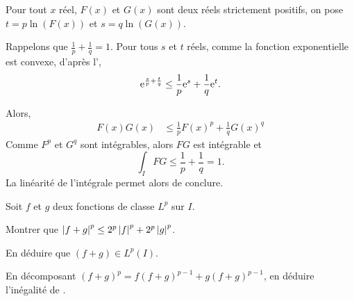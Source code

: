\begin{solution}
\begin{reponses}
\item Pour tout $x$ réel, $F(x)$ et $G(x)$ sont deux réels strictement positifs, on pose $t = p \ln(F(x))$ et $s = q \ln(G(x))$.

\item Rappelons que $\frac{1}{p} + \frac{1}{q} = 1$. Pour tous $s$ et $t$ réels, comme la fonction exponentielle est convexe, d'après l',
\[
\mathrm{e}^{\frac{s}{p} + \frac{t}{q}} \leq \frac{1}{p} \mathrm{e}^s + \frac{1}{q} \mathrm{e}^t.
\]

\item Alors,
\begin{align*}
F(x) G(x) &\leq \frac{1}{p} F(x)^p + \frac{1}{q} G(x)^q
\end{align*}
Comme $F^p$ et $G^q$ sont intégrables, alors $F G$ est intégrable et
\[
\int_I F G \leq \frac{1}{p} + \frac{1}{q} = 1.
\]
La linéarité de l'intégrale permet alors de conclure.
\end{reponses}
\end{solution}

\begin{exercice}
Soit $f$ et $g$ deux fonctions de classe $L^p$ sur $I$.
\begin{questions}
\item Montrer que $\left| f + g \right|^p \leq 2^p \left| f \right|^p + 2^p \left| g \right|^p$.

\item En déduire que $(f + g) \in L^p(I)$.

\item En décomposant $(f + g)^p = f (f + g)^{p-1} + g (f + g)^{p-1}$, en déduire l'inégalité de .
\end{questions}
\end{exercice}

